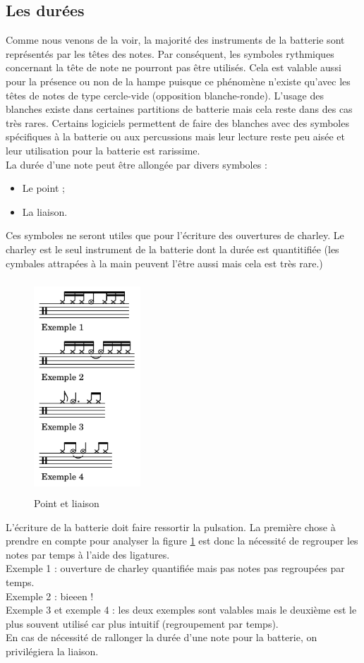 \subsection*{Les durées}
\label{hho}
Comme nous venons de la voir, la majorité des instruments de la batterie sont représentés par les têtes des notes. Par conséquent, les symboles rythmiques concernant la tête de note ne pourront pas être utilisés. Cela est valable aussi pour la présence ou non de la hampe puisque ce phénomène n’existe qu’avec les têtes de notes de type cercle-vide (opposition blanche-ronde). L’usage des blanches existe dans certaines partitions de batterie \cite{system_drums} mais cela reste dans des cas très rares. Certains logiciels permettent de faire des blanches avec des symboles spécifiques à la batterie ou aux percussions mais leur lecture reste peu aisée et leur utilisation pour la batterie est rarissime.\\
La durée d’une note peut être allongée par divers symboles :
\begin{itemize}
	\item Le point ;
	\item La liaison.
\end{itemize}
Ces symboles ne seront utiles que pour l’écriture des ouvertures de charley. Le charley est le seul instrument de la batterie dont la durée est quantitifiée (les cymbales attrapées à la main peuvent l’être aussi mais cela est très rare.)\newpage
\begin{figure}[h]
	\centering
	\includegraphics[height=80mm, width=40mm]{z_images/3_methodes/0_notation_de_la_batterie/3_point_et_liaison.png}
	\caption{Point et liaison}
	\label{point_liaison}
\end{figure}
L’écriture de la batterie doit faire ressortir la pulsation. La première chose à prendre en compte pour analyser la figure \ref{point_liaison} est donc la nécessité de regrouper les notes par temps à l’aide des ligatures.\\
Exemple 1 : ouverture de charley quantifiée mais pas notes pas regroupées par temps.\\
Exemple 2 : bieeen !\\
Exemple 3 et exemple 4 : les deux exemples sont valables mais le deuxième est le plus souvent utilisé car plus intuitif (regroupement par temps).\\
En cas de nécessité de rallonger la durée d’une note pour la batterie, on privilégiera la liaison.
